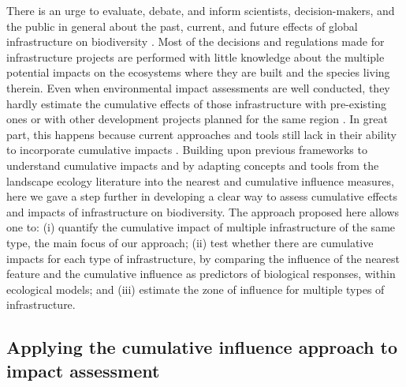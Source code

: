 \documentclass[titlepage]{article}
\begin{document}
There is an urge to evaluate, debate, and inform scientists, decision-makers, and the public in general about the past, current, and future effects of global infrastructure on biodiversity \citep{laurance_conservation_2018}. Most of the decisions and regulations made for infrastructure projects are performed with little knowledge about the multiple potential impacts on the ecosystems where they are built and the species living therein. Even when environmental impact assessments are well conducted, they hardly estimate the cumulative effects of those infrastructure with pre-existing ones or with other development projects planned for the same region \citep{laurance_roads_2017, johnson_regulating_2011}. In great part, this happens because current approaches and tools still lack in their ability to incorporate cumulative impacts \citep[but see][for recent advances]{gillingham_integration_2016}. Building upon previous frameworks to understand cumulative impacts \citep{naugle_unifying_2011} and by adapting concepts and tools from the landscape ecology literature into the nearest and cumulative influence measures, here we gave a step further in developing a clear way to assess cumulative effects and impacts of infrastructure on biodiversity. The approach proposed here allows one to: (i) quantify the cumulative impact of multiple infrastructure of the same type, the main focus of our approach; (ii) test whether there are cumulative impacts for each type of infrastructure, by comparing the influence of the nearest feature and the cumulative influence as predictors of biological responses, within ecological models; and (iii) estimate the zone 
of influence for multiple types of infrastructure. 

\subsection{Applying the cumulative influence approach to impact assessment}
\end{document}
